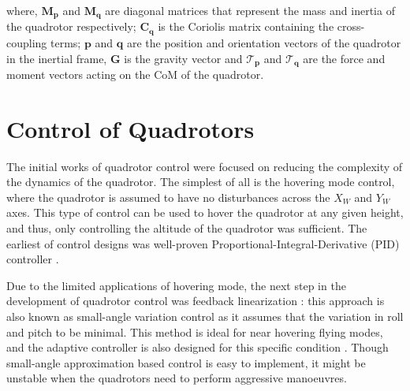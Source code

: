 where, $\mathbf{M_p}$ and $\mathbf{M_q}$ are diagonal matrices that represent the mass and inertia of the quadrotor respectively; $\mathbf{C_q}$ is the Coriolis matrix containing the cross-coupling terms; $\mathbf{p}$ and $\mathbf{q}$ are the position and orientation vectors of the quadrotor in the inertial frame, $\mathbf{G}$ is the gravity vector and $\mathbf{\mathcal{T}_p}$ and $\mathbf{\mathcal{T}_q}$ are the force and moment vectors acting on the CoM of the quadrotor.






\section{Control of Quadrotors}
The initial works of quadrotor control were focused on reducing the complexity of the dynamics of the quadrotor. The simplest of all is the hovering mode control, where the quadrotor is assumed to have no disturbances across the $X_W$ and $Y_W$ axes. This type of control can be used to hover the quadrotor at any given height, and thus, only controlling the altitude of the quadrotor was sufficient. The earliest of control designs was well-proven Proportional-Integral-Derivative (PID) controller \cite{1302409,1389776, boua_pid}. %


Due to the limited applications of hovering mode, the next step in the development of quadrotor control was feedback linearization \cite{280180, smallanglemodel2, smallanglemodel3}: this approach is also known as small-angle variation control as it assumes that the variation in roll and pitch to be minimal.
This method is ideal for near hovering flying modes, and the adaptive controller is also designed for this specific condition \cite{lee2009asmc}. Though small-angle approximation based control is easy to implement, it might be unstable when the quadrotors need to perform aggressive manoeuvres.

